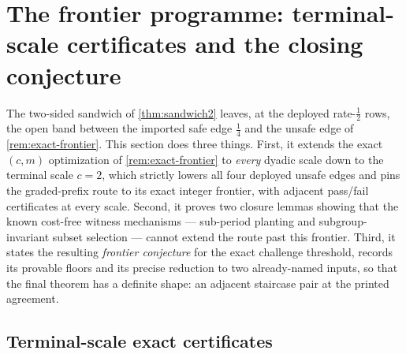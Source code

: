 \providecommand{\B}{\mathbb B}
\providecommand{\Hb}{H_{\mathrm b}}
\providecommand{\Lst}{\mathrm{Lst}}
\providecommand{\emca}{\varepsilon_{\mathrm{mca}}}
\providecommand{\ceil}[1]{\left\lceil #1\right\rceil}
\providecommand{\floor}[1]{\left\lfloor #1\right\rfloor}
\providecommand{\eca}{\varepsilon_{\mathrm{ca}}}

\section{The frontier programme: terminal-scale certificates and the closing conjecture}\label{sec:v13f-frontier}

The two-sided sandwich of \cref{thm:sandwich2} leaves, at the deployed rate-$\tfrac12$ rows, the open band between the imported safe edge $\tfrac14$ and the unsafe edge of \cref{rem:exact-frontier}.  This section does three things.  First, it extends the exact $(c,m)$ optimization of \cref{rem:exact-frontier} to \emph{every} dyadic scale down to the terminal scale $c=2$, which strictly lowers all four deployed unsafe edges and pins the graded-prefix route to its exact integer frontier, with adjacent pass/fail certificates at every scale.  Second, it proves two closure lemmas showing that the known cost-free witness mechanisms --- sub-period planting and subgroup-invariant subset selection --- cannot extend the route past this frontier.  Third, it states the resulting \emph{frontier conjecture} for the exact challenge threshold, records its provable floors and its precise reduction to two already-named inputs, so that the final theorem has a definite shape: an adjacent staircase pair at the printed agreement.

\subsection{Terminal-scale exact certificates}

